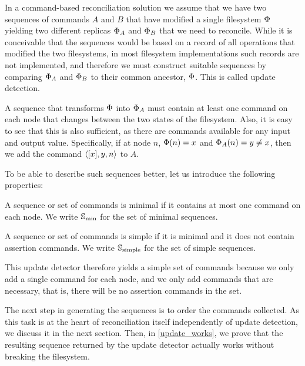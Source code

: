 
In a command-based reconciliation solution we assume that we have two sequences of commands
$A$ and $B$ that have modified a single filesystem $\Phi$ yielding two different replicas $\Phi_A$ and $\Phi_B$ that we
need to reconcile. While it is conceivable that the sequences would be based on a record of
all operations that modified the two filesystems, in most filesystem implementations
such records are not implemented, and therefore we must construct suitable sequences
by comparing $\Phi_A$ and $\Phi_B$ to their common ancestor, $\Phi$. This is called update detection.

A sequence that transforms $\Phi$ into $\Phi_A$ must contain at least one command on each node
that changes between the two states of the filesystem. Also, it is easy to see that this is also
sufficient, as there are commands available for any input and output value. 
Specifically, if at node $n$, $\Phi(n)=x$ and $\Phi_A(n)=y\neq x$, then we add the command $\langle{[x],y,n}\rangle$ to $A$.

To be able to describe such sequences better, let us introduce the following properties:

\begin{mydef}
A sequence or set of commands is minimal if it contains at most one command on each node.
We write $\mathbb{S}_{\mathrm{min}}$ for the set of minimal sequences.
\end{mydef}

\begin{mydef}
A sequence or set of commands is simple if it is minimal and it does not contain assertion commands.
We write $\mathbb{S}_{\mathrm{simple}}$ for the set of simple sequences.
\end{mydef}

This update detector therefore yields a simple set of commands because we only add a single command
for each node, and we only add commands that are necessary, that is, there will be no 
assertion commands in the set.

The next step in generating the sequences is to order the commands collected.
As this task is at the heart of reconciliation itself independently of update detection,
we discuss it in the next section.
Then, in \cref{update_works}, we prove that the resulting sequence 
returned by the update detector actually works without breaking the filesystem.
